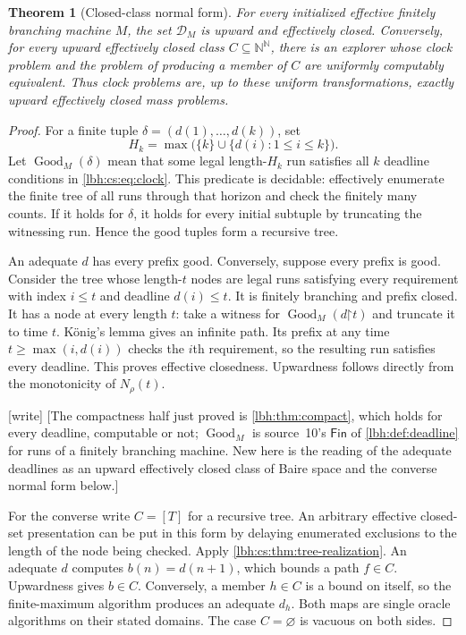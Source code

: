 \documentclass[11pt,letterpaper]{article}
\newtheorem{theorem}{Theorem}[section]
\theoremstyle{definition}
\theoremstyle{remark}
\newcommand{\N}{\mathbb N}
\newcommand{\Fin}{\mathsf{Fin}}
\newcommand{\pref}{\mathord{\upharpoonright}}
\newcommand{\1}{\mathbf 1}
\newcommand{\csClock}{\mathcal D}
\newcommand{\wtag}{\textup{[write]}}%
\begin{document}
\begin{theorem}[Closed-class normal form]\label{lbh:cs:thm:closed}
For every initialized effective finitely branching machine $M$, the set
$\csClock_M$ is upward and effectively closed. Conversely, for every upward
effectively closed class $C\subseteq\N^\N$, there is an explorer whose
clock problem and the problem of producing a member of $C$ are uniformly
computably equivalent. Thus clock problems are, up to these uniform
transformations, exactly upward effectively closed mass problems.
\end{theorem}

\begin{proof}
For a finite tuple $\delta=(d(1),\ldots,d(k))$, set
\[
 H_k=\max\bigl(\{k\}\cup\{d(i):1\leq i\leq k\}\bigr).
\]
Let $\operatorname{Good}_M(\delta)$ mean that some legal length-$H_k$ run
satisfies all $k$ deadline conditions in \eqref{lbh:cs:eq:clock}. This predicate
is decidable: effectively enumerate the finite tree of all runs through
that horizon and check the finitely many counts. If it holds for
$\delta$, it holds for every initial subtuple by truncating the witnessing
run. Hence the good tuples form a recursive tree.

An adequate $d$ has every prefix good. Conversely, suppose every prefix
is good. Consider the tree whose length-$t$ nodes are legal runs satisfying every
requirement with index $i\leq t$ and deadline $d(i)\leq t$. It is finitely
branching and prefix closed. It has a node at every length $t$: take a
witness for $\operatorname{Good}_M(d\pref t)$ and truncate it to time $t$.
K\"onig's lemma gives an infinite path. Its prefix at any time
$t\geq\max(i,d(i))$ checks the $i$th requirement, so the resulting run
satisfies every deadline.
This proves effective closedness. Upwardness follows directly from the
monotonicity of $N_\rho(t)$.
\par\wtag{} [The compactness half just proved is \cref{lbh:thm:compact}, which holds for every
deadline, computable or not; $\operatorname{Good}_M$ is source~10's $\Fin$ of
\cref{lbh:def:deadline} for runs of a finitely branching machine. New here is the reading of the
adequate deadlines as an upward effectively closed class of Baire space and the converse normal form
below.]\par

For the converse write $C=[T]$ for a recursive tree. An arbitrary effective
closed-set presentation can be put in this form by delaying enumerated
exclusions to the length of the node being checked. Apply
\cref{lbh:cs:thm:tree-realization}. An adequate $d$ computes $b(n)=d(n+1)$, which
bounds a path $f\in C$. Upwardness gives $b\in C$. Conversely, a member
$h\in C$ is a bound on itself, so the finite-maximum algorithm produces
an adequate $d_h$. Both maps are single oracle algorithms on their stated
domains. The case $C=\varnothing$ is vacuous on both sides.
\end{proof}
\end{document}
